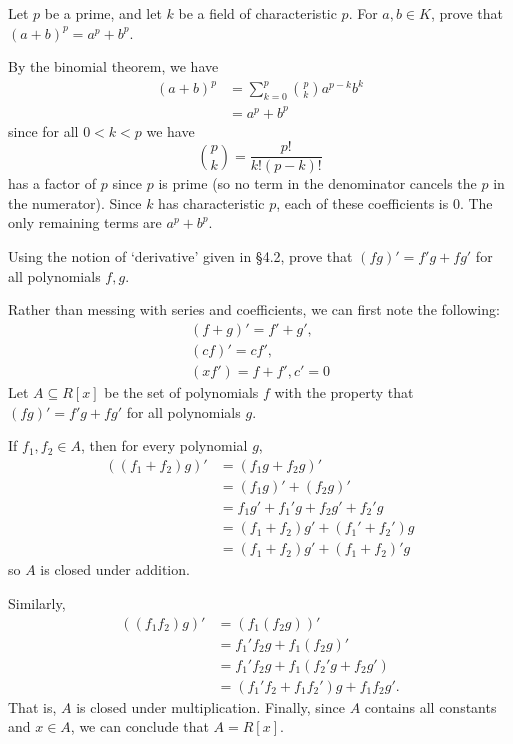 \documentclass[../../master.tex]{subfiles}
\begin{document}
\begin{problem}
    Let $p$ be a prime, and let $k$ be a field of characteristic $p$.
    For $a, b \in K$, prove that $(a + b)^{p} = a^{p} + b^{p}$.
\end{problem}

\begin{solution}
    By the binomial theorem, we have
    \begin{align*}
        (a + b)^{p} &= \sum_{k=0}^{p} {p \choose k} a^{p-k} b^{k} \\
                    &= a^{p} + b^{p}
    \end{align*}
    since for all $0 < k < p$ we have
    \[
        {p \choose k} = \frac{p!}{k! (p - k)!}
    \]
    has a factor of $p$ since $p$ is prime (so no term in the denominator cancels the $p$ in the numerator).
    Since $k$ has characteristic $p$, each of these coefficients is 0.
    The only remaining terms are $a^{p} + b^{p}$.
\end{solution}

\begin{problem}
    Using the notion of `derivative' given in \S 4.2, prove that $(fg)' = f'g + fg'$ for all polynomials $f, g$.
\end{problem}

\begin{solution}
    Rather than messing with series and coefficients, we can first note the following:
    \begin{gather*}
        (f + g)' = f' + g', \\
        (cf)' = cf', \\
        (xf') = f + f',
        c' = 0
    \end{gather*}
    Let $A \subseteq R[x]$ be the set of polynomials $f$ with the property that $(fg)' = f'g + fg'$ for all polynomials $g$.

    If $f_1, f_2 \in A$, then for every polynomial $g$,
    \begin{align*}
        ((f_1 + f_2)g)' &= (f_1g + f_2g)' \\
                        &= (f_1g)' + (f_2g)' \\
                        &= f_1g' + f_1'g + f_2g' + f_2'g \\
                        &= (f_1 + f_2)g' + (f_1' + f_2')g \\
                        &= (f_1 + f_2)g' + (f_1 + f_2)'g
    \end{align*}
    so $A$ is closed under addition.

    Similarly,
    \begin{align*}
        ((f_1 f_2)g)' &= (f_1 (f_2g))' \\
                      &= f_1' f_2g + f_1 (f_2g)' \\
                      &= f_1' f_2g + f_1 (f_2'g + f_2g') \\
                      &= (f_1' f_2 + f_1f_2') g + f_1 f_2 g'.
    \end{align*}
    That is, $A$ is closed under multiplication.
    Finally, since $A$ contains all constants and $x \in A$, we can conclude that $A = R[x]$.
\end{solution}
\end{document}
